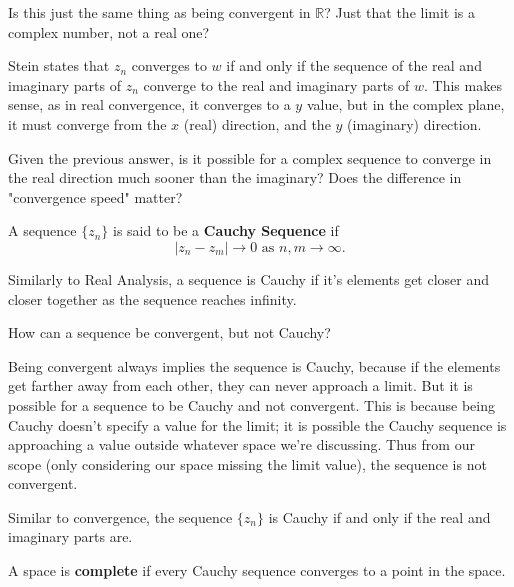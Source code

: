 \documentclass[12pt]{article}
\begin{document}
\begin{aq}
  Is this just the same thing as being convergent in $\mathbb{R}$? Just that the limit is a complex 
  number, not a real one?
\end{aq}

\begin{answer}
  Stein states that $z_n$ converges to $w$ if and only if the sequence of the real and imaginary parts
  of $z_n$ converge to the real and imaginary parts of $w$. This makes sense, as in real convergence, 
  it converges to a $y$ value, but in the complex plane, it must converge from the $x$ (real) direction, 
  and the $y$ (imaginary) direction.
\end{answer}

\begin{uq}
  Given the previous answer, is it possible for a complex sequence to converge in the real direction 
  much sooner than the imaginary? Does the difference in "convergence speed" matter?
\end{uq}

\begin{definition}
  A sequence $\{ z_n \}$ is said to be a \textbf{Cauchy Sequence} if 
  $$ \vert z_n - z_m \vert \to 0 \text{ as } n,m \to \infty .$$
\end{definition}

Similarly to Real Analysis, a sequence is Cauchy if it's elements get closer and closer together 
as the sequence reaches infinity. 

\begin{aq}
  How can a sequence be convergent, but not Cauchy?
\end{aq}
\begin{answer}
  Being convergent always implies the sequence is Cauchy, because if the elements get farther away from each 
  other, they can never approach a limit. But it is possible for a sequence to be Cauchy and not convergent. 
  This is because being Cauchy doesn't specify a value for the limit; it is possible the Cauchy sequence is 
  approaching a value outside whatever space we're discussing. Thus from our scope (only considering our space 
  missing the limit value), the sequence is not convergent.
\end{answer}

Similar to convergence, the sequence $\{z_n\}$ is Cauchy if and only if the real and imaginary parts are. 

\begin{definition}
  A space is \textbf{complete} if every Cauchy sequence converges to a point in the space. 
\end{definition}
\end{document}
